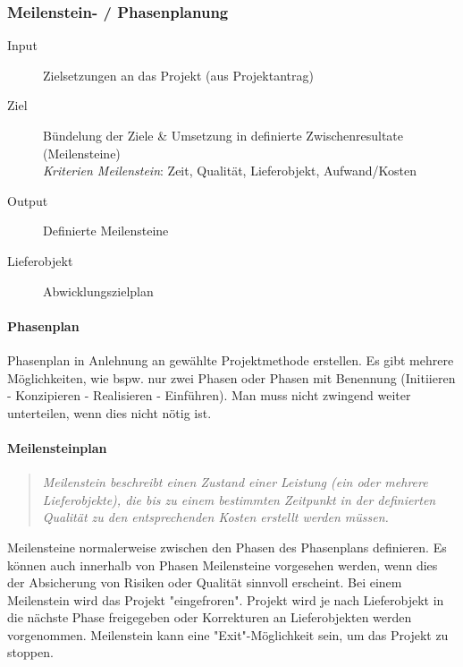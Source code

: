 \documentclass[a4paper]{article}
\begin{document}
		\subsubsection{Meilenstein- / Phasenplanung}
		
		\begin{description}
			\item[Input] Zielsetzungen an das Projekt (aus Projektantrag)
			\item[Ziel] Bündelung der Ziele \& Umsetzung in definierte Zwischenresultate (Meilensteine)\\
			\textit{Kriterien Meilenstein}: Zeit, Qualität, Lieferobjekt, Aufwand/Kosten
			\item[Output] Definierte Meilensteine
			\item[Lieferobjekt] Abwicklungszielplan
		\end{description}
	
			\paragraph{Phasenplan}
			
			Phasenplan in Anlehnung an gewählte Projektmethode erstellen.
			Es gibt mehrere Möglichkeiten, wie bspw. nur zwei Phasen oder Phasen mit Benennung (Initiieren - Konzipieren - Realisieren - Einführen).
			Man muss nicht zwingend weiter unterteilen, wenn dies nicht nötig ist.
			
			\paragraph{Meilensteinplan}
			
				\begin{quote}
					\textit{Meilenstein beschreibt einen Zustand einer Leistung (ein oder mehrere Lieferobjekte), die bis zu einem bestimmten Zeitpunkt in der definierten Qualität zu den entsprechenden Kosten erstellt werden müssen.}
				\end{quote}
				\noindent
				Meilensteine normalerweise zwischen den Phasen des Phasenplans definieren.
				Es können auch innerhalb von Phasen Meilensteine vorgesehen werden, wenn dies der Absicherung von Risiken oder Qualität sinnvoll erscheint.
				Bei einem Meilenstein wird das Projekt "eingefroren".
				Projekt wird je nach Lieferobjekt in die nächste Phase freigegeben oder Korrekturen an Lieferobjekten werden vorgenommen.
				Meilenstein kann eine "Exit"-Möglichkeit sein, um das Projekt zu stoppen.
		
\end{document}

